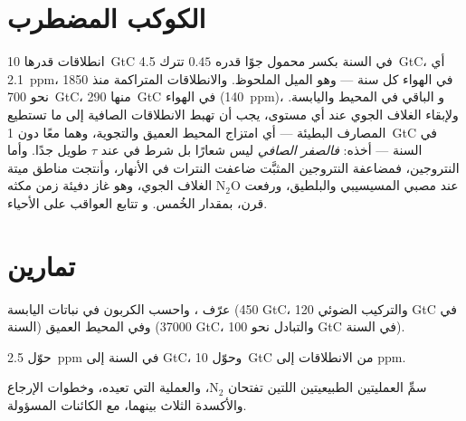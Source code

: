 \section{الكوكب المضطرب}

\begin{example}\label{ex:b2:biogeochemical-cycles:numbers}
انطلاقات قدرها \qty{10}{GtC} في السنة بكسر محمول جوًا قدره
$0.45$ تترك \qty{4.5}{GtC}، أي \qty{2.1}{ppm}، في الهواء كل سنة
--- وهو الميل الملحوظ. والانطلاقات المتراكمة منذ 1850 نحو
\qty{700}{GtC}، منها \qty{290}{GtC} في الهواء (140~\unit{ppm})، و
الباقي في المحيط واليابسة. ولإبقاء الغلاف الجوي عند أي مستوى، يجب
أن تهبط الانطلاقات الصافية إلى ما تستطيع المصارف البطيئة --- أي امتزاج المحيط العميق
والتجوية، وهما معًا دون \qty{1}{GtC} في السنة --- أخذه:
\emph{فالصفر الصافي} ليس شعارًا بل شرط 
في  عند $\tau$ طويل جدًا. وأما النتروجين، فمضاعفة
 النتروجين المثبَّت ضاعفت النترات في الأنهار، وأنتجت
مناطق ميتة عند مصبي المسيسيبي والبلطيق، ورفعت
$\mathrm{N_2O}$ الغلاف الجوي، وهو غاز دفيئة زمن مكثه
قرن، بمقدار الخُمس. و تتابع
العواقب على الأحياء.
\end{example}

\section{تمارين}

\begin{exercise}[$\star$]\label{exo:b2:biogeochemical-cycles:1}
عرّف   ، واحسب
 الكربون في نباتات اليابسة (450 GtC، والتركيب الضوئي
120 GtC في السنة) وفي المحيط العميق (\num{37000} GtC، والتبادل
نحو 100 GtC في السنة).
\end{exercise}

\begin{exercise}[$\star$]\label{exo:b2:biogeochemical-cycles:2}
حوّل \qty{2.5}{ppm} في السنة إلى GtC، وحوّل \qty{10}{GtC} من
الانطلاقات إلى \unit{ppm}.
\end{exercise}

\begin{exercise}[$\star$]\label{exo:b2:biogeochemical-cycles:3}
سمِّ العمليتين الطبيعيتين اللتين تفتحان $\mathrm{N_2}$، والعملية التي
تعيده، وخطوات الإرجاع والأكسدة الثلاث بينهما، مع
الكائنات المسؤولة.
\end{exercise}

